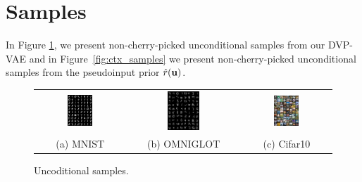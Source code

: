 \newpage
\section{Samples}\label{appendix:samples}

In Figure \ref{fig:all_samples}, we present non-cherry-picked unconditional samples from our DVP-VAE and in Figure~\ref{fig:ctx_samples} we present non-cherry-picked unconditional samples from the pseudoinput prior $\hat{r}({\mathbf{u}})$.

\begin{figure}[!htbp]
    \centering
    \begin{tabular}{ccc}
    \includegraphics[width=0.3\textwidth]{pics/5_dvp/mnist_samples_t0.7.pdf} &  
        \includegraphics[width=0.3\textwidth]{pics/5_dvp/omniglot_samples_t0.7.pdf} & 
        \includegraphics[width=0.3\textwidth]{pics/5_dvp/cifar10_samples_t0.7.pdf}\\
        (a) MNIST  & (b) OMNIGLOT & (c) Cifar10\\
    \end{tabular}
    \caption{Uncoditional samples.}
    \vskip -10pt
    \label{fig:all_samples}
\end{figure}

